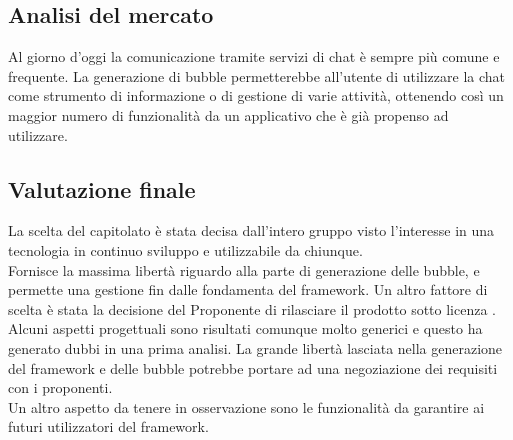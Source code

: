 \subsection{Analisi del mercato}
Al giorno d'oggi la comunicazione tramite servizi di chat è sempre più comune e frequente. La generazione di bubble permetterebbe all'utente di utilizzare la chat come strumento di informazione o di gestione di varie attività, ottenendo così un maggior numero di funzionalità da un applicativo che è già propenso ad utilizzare.

\subsection{Valutazione finale}
La scelta del capitolato è stata decisa dall'intero gruppo visto l'interesse in una tecnologia in continuo sviluppo e utilizzabile da chiunque.\\
Fornisce la massima libertà riguardo alla parte di generazione delle bubble, e permette una gestione fin dalle fondamenta del framework. Un altro fattore di scelta è stata la decisione del Proponente di rilasciare il prodotto sotto licenza .\\
Alcuni aspetti progettuali sono risultati comunque molto generici e questo ha generato dubbi in una prima analisi. La grande libertà lasciata nella generazione del framework e delle bubble potrebbe portare ad una negoziazione dei requisiti con i proponenti.\\
Un altro aspetto da tenere in osservazione sono le funzionalità da garantire ai futuri utilizzatori del framework.

